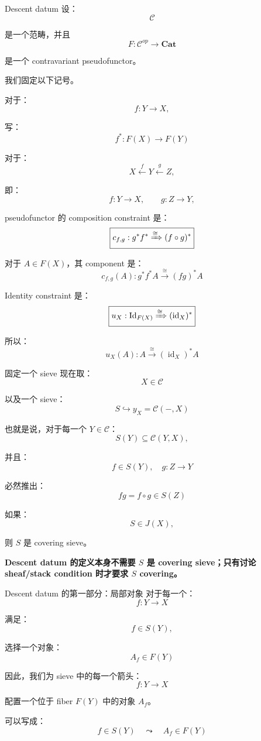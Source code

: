 \documentclass{beamer}
\begin{document}
\begin{frame}{Descent datum}
设：
$$
\mathcal C
$$

是一个范畴，并且
$$
\boxed{
F:\mathcal C^{op}\to\mathbf{Cat}
}
$$

是一个 contravariant pseudofunctor。

我们固定以下记号。

对于：
$$
f:Y\to X,
$$

写：
$$
\boxed{
f^*:F(X)\to F(Y)
}
$$

对于：
$$
X\xleftarrow{f}Y\xleftarrow{g}Z,
$$

即：
$$
f:Y\to X,\qquad g:Z\to Y,
$$

pseudofunctor 的 composition constraint 是：
$$
\boxed{
c_{f,g}:
g^*f^*
\xRightarrow{\cong}
(f\circ g)^*
}
$$

对于 \(A\in F(X)\)，其 component 是：
$$
\boxed{
c_{f,g}(A):
g^*f^*A
\xrightarrow{\cong}
(fg)^*A
}
$$

Identity constraint 是：
$$
\boxed{
u_X:
\operatorname{Id}_{F(X)}
\xRightarrow{\cong}
(\operatorname{id}_X)^*
}
$$

所以：
$$
u_X(A):
A\xrightarrow{\cong}(\operatorname{id}_X)^*A
$$
\end{frame}

\begin{frame}{固定一个 sieve}
现在取：
$$
X\in\mathcal C
$$

以及一个 sieve：
$$
\boxed{
S\hookrightarrow y_X=\mathcal C(-,X)
}
$$

也就是说，对于每一个 \(Y\in\mathcal C\)：
$$
S(Y)\subseteq\mathcal C(Y,X),
$$

并且：
$$
f\in S(Y),\quad g:Z\to Y
$$

必然推出：
$$
fg=f\circ g\in S(Z)
$$

如果：
$$
S\in J(X),
$$

则 \(S\) 是 covering sieve。

\textbf{Descent datum 的定义本身不需要 \(S\) 是 covering sieve；只有讨论 sheaf/stack condition 时才要求 \(S\) covering。}
\end{frame}

\begin{frame}[fragile]{Descent datum 的第一部分：局部对象}
对于每一个：
$$
f:Y\to X
$$

满足：
$$
f\in S(Y),
$$

选择一个对象：
$$
\boxed{
A_f\in F(Y)
}
$$

因此，我们为 sieve 中的每一个箭头：
$$
f:Y\to X
$$

配置一个位于 fiber \(F(Y)\) 中的对象 \(A_f\)。

可以写成：
$$
\boxed{
f\in S(Y)
\quad\leadsto\quad
A_f\in F(Y)
}
$$
\end{frame}
\end{document}
